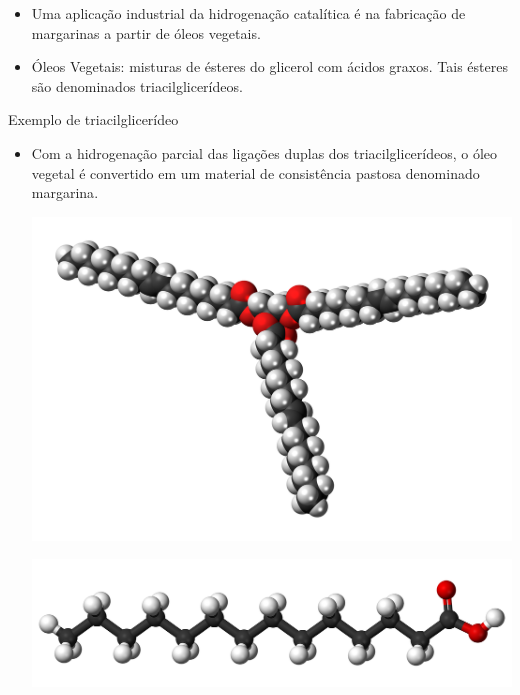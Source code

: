 \documentclass[presentation,professionalfonts,aspectratio=169]{beamer}
\begin{document}
\begin{frame}[label={sec:orgaa69c32}]{}
\begin{itemize}
\item Uma aplicação industrial da hidrogenação catalítica é na fabricação de margarinas a partir de óleos vegetais.
\item Óleos Vegetais: misturas de ésteres do glicerol com ácidos graxos. Tais ésteres são denominados \alert{triacilglicerídeos}.
\end{itemize}


\begin{bclogo}[couleur=blue!30 , arrondi=0.1 , logo=\bcplume , epBarre=3.5]{Exemplo de triacilglicerídeo}
\end{bclogo}
\end{frame}


\begin{frame}[label={sec:orgeb61786}]{}
\begin{itemize}
\item Com a hidrogenação parcial das ligações duplas dos triacilglicerídeos, o óleo vegetal é convertido em um material de consistência pastosa denominado \alert{margarina}.

\begin{center}
\includegraphics[scale=0.05]{QO/ReacoesOrganicas/trigli3D.png}
\end{center} \par
\begin{center}
\includegraphics[scale=0.05]{QO/ReacoesOrganicas/triglimono.png}
\end{center}
\end{itemize}
\end{frame}
\end{document}
